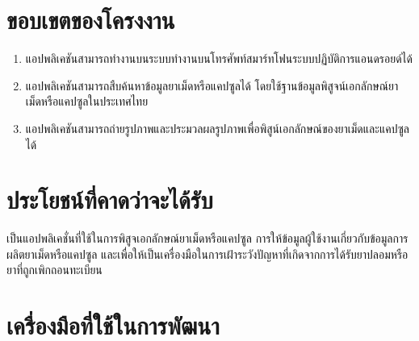 \section{ขอบเขตของโครงงาน}
    
    \begin{enumerate}
        \item แอปพลิเคชันสามารถทำงานบนระบบทำงานบนโทรศัพท์สมาร์ทโฟนระบบปฏิบัติการแอนดรอยด์ได้
        \item แอปพลิเคชันสามารถสืบค้นหาข้อมูลยาเม็ดหรือแคปซูลได้ โดยใช้ฐานข้อมูลพิสูจน์เอกลักษณ์ยาเม็ดหรือแคปซูลในประเทศไทย
        \item แอปพลิเคชันสามารถถ่ายรูปภาพและประมวลผลรูปภาพเพื่อพิสูน์เอกลักษณ์ของยาเม็ดและแคปซูลได้
    \end{enumerate}
\section{ประโยชน์ที่คาดว่าจะได้รับ}
    
    เป็นแอปพลิเคชั่นที่ใช้ในการพิสูจเอกลักษณ์ยาเม็ดหรือแคปซูล การให้ข้อมูลผู้ใช้งานเกี่ยวกับข้อมูลการผลิตยาเม็ดหรือแคปซูล และเพื่อให้เป็นเครื่องมือในการเฝ้าระวังปัญหาที่เกิดจากการได้รับยาปลอมหรือยาที่ถูกเพิกถอนทะเบียน
\section{เครื่องมือที่ใช้ในการพัฒนา}
    
